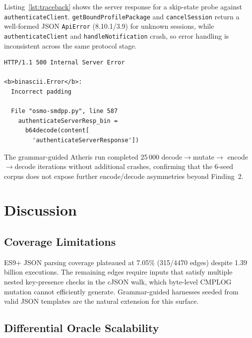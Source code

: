\documentclass[final,3p,times,twocolumn]{elsarticle}
\begin{document}
\noindent Listing~\ref{lst:traceback} shows the server response for
a skip-state probe against \texttt{authenticateClient}.
\texttt{getBoundProfilePackage} and \texttt{cancelSession} return a
well-formed JSON \texttt{ApiError} (8.10.1/3.9) for unknown sessions,
while \texttt{authenticateClient} and \texttt{handleNotification} crash, so error
handling is inconsistent across the same protocol stage.

\begin{lstlisting}[style=pyoutstyle,caption={HTTP 500 response body (truncated) for a skip-state probe to \texttt{/authenticateClient}. The Twisted traceback exposes server file paths and variable state.},label=lst:traceback]
HTTP/1.1 500 Internal Server Error

<b>binascii.Error</b>:
  Incorrect padding

  File "osmo-smdpp.py", line 587
    authenticateServerResp_bin =
      b64decode(content[
        'authenticateServerResponse'])
\end{lstlisting}

The grammar-guided Atheris run completed 25\,000 decode$\to$mutate$\to$
encode$\to$decode iterations without additional crashes,
confirming that the 6-seed corpus does not expose further
encode/decode asymmetries beyond Finding~2.

\section{Discussion}\label{sec:discussion}

\subsection{Coverage Limitations}

ES9+ JSON parsing coverage plateaued at 7.05\% (315/4470 edges) despite
1.39 billion executions.
The remaining edges require inputs that satisfy multiple nested key-presence
checks in the cJSON walk, which byte-level CMPLOG mutation cannot efficiently
generate.
Grammar-guided harnesses seeded from valid JSON templates are the natural
extension for this surface.

\subsection{Differential Oracle Scalability}
\end{document}
